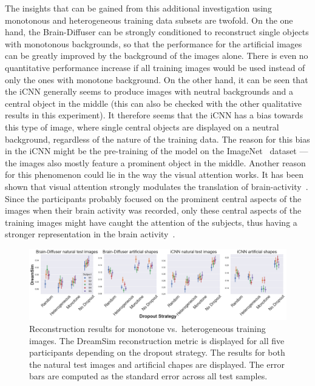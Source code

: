 The insights that can be gained from this additional investigation using monotonous and heterogeneous training data subsets are twofold. On the one hand, the Brain-Diffuser can be strongly conditioned to reconstruct single objects with monotonous backgrounds, so that the performance for the artificial images can be greatly improved by the background of the images alone. There is even no quantitative performance increase if all training images would be used instead of only the ones with monotone background. On the other hand, it can be seen that the iCNN generally seems to produce images with neutral backgrounds and a central object in the middle (this can also be checked with the other qualitative results in this experiment). It therefore seems that the iCNN has a bias towards this type of image, where single central objects are displayed on a neutral background, regardless of the nature of the training data. The reason for this bias in the iCNN might be the pre-training of the model on the ImageNet~\cite{dengImageNetLargescaleHierarchical2009} dataset --- the images also mostly feature a prominent object in the middle. Another reason for this phenomenon could lie in the way the visual attention works. It has been shown that visual attention strongly modulates the translation of brain-activity~\cite{horikawaAttentionModulatesNeural2022}. Since the participants probably focused on the prominent central aspects of the images when their brain activity was recorded, only these central aspects of the training images might have caught the attention of the subjects, thus having a stronger representation in the brain activity~\cite{wolfeVisualAttention2000}. 


\begin{figure}[ht]
  \centering
  \includegraphics[width=1\textwidth]{plots/dropout_discussion_reconstruction.png}
  \caption[Reconstruction performance monotone vs.\ heterogeneous training sample]{Reconstruction results for monotone vs.\ heterogeneous training images. The DreamSim reconstruction metric is displayed for all five participants depending on the dropout strategy. The results for both the natural test images and artificial chapes are displayed. The error bars are computed as the standard error across all test samples.}\label{fig:dropout_discussion_reconstruction}
\end{figure}


